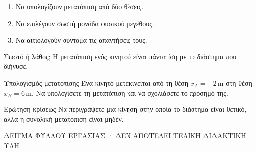 \begin{LearningGoals}
\begin{enumerate}
\item Να υπολογίζουν μετατόπιση από δύο θέσεις.
\item Να επιλέγουν σωστή μονάδα φυσικού μεγέθους.
\item Να αιτιολογούν σύντομα τις απαντήσεις τους.
\end{enumerate}
\end{LearningGoals}
\begin{exercise}[]{Σωστό ή λάθος;}
Η μετατόπιση ενός κινητού είναι πάντα ίση με το διάστημα που διήνυσε.\hspace{.5em}\hfill\TrueFalseChoices
\end{exercise}
\AnswerLine
{}
\begin{exercise}[]{Υπολογισμός μετατόπισης}
Ένα κινητό μετακινείται από τη θέση \(x_A=-2\,\mathrm m\) στη θέση \(x_B=6\,\mathrm m\). Να υπολογίσετε τη μετατόπιση και να σχολιάσετε το πρόσημό της.
\end{exercise}
\begin{exercise}[]{Ερώτηση κρίσεως}
Να περιγράψετε μια κίνηση στην οποία το διάστημα είναι θετικό, αλλά η συνολική μετατόπιση είναι μηδέν.
\end{exercise}
\AnswerLine
\vfill\begin{center}{\footnotesize\color{BookSecondary}ΔΕΙΓΜΑ ΦΥΛΛΟΥ ΕΡΓΑΣΙΑΣ · ΔΕΝ ΑΠΟΤΕΛΕΙ ΤΕΛΙΚΗ ΔΙΔΑΚΤΙΚΗ ΥΛΗ}\end{center}
